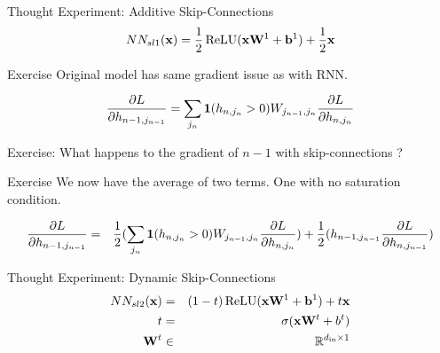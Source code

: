 \documentclass{beamer}
\begin{document}
\begin{frame}{Thought Experiment: Additive Skip-Connections}
  \[NN_{sl1}(\boldx) = \frac{1}{2} \relu(\boldx \boldW^1 + \boldb^1) + \frac{1}{2} \boldx \]
      \begin{center}
    \end{center}
  
\end{frame}

\begin{frame}{Exercise}
  Original model has same gradient issue as with RNN.

  \[ \frac{\partial L}{\partial h_{n-1,j_{n-1}} }   =  \sum_{j_n}  \mathbf{1}(h_{n, j_n} > 0) W_{j_{n-1},j_n}  \frac{\partial L}{\partial h_{n, j_n}}     \]


  Exercise: What happens to the gradient of $n-1$ with skip-connections ?
\end{frame}


\begin{frame}{Exercise}
  We now have the average of two terms. One with no saturation condition.
  \air 
  
  \begin{eqnarray*}
     \frac{\partial L}{\partial h_{n-1,j_{n-1}} } & = & \frac{1}{2} (\sum_{j_n}   \mathbf{1}(h_{n, j_n} > 0) W_{j_{n-1},j_n} \frac{\partial L}{\partial h_{n, j_n}}) + \frac{1}{2} ( h_{n-1, j_{n-1}} \frac{\partial L}{\partial h_{n, j_{n-1}}})  \\ 
  \end{eqnarray*}

 

\end{frame}

\begin{frame}{Thought Experiment: Dynamic Skip-Connections}
  \begin{eqnarray*}
    NN_{sl2}(\boldx) &=& (1-t) \relu(\boldx \boldW^1 + \boldb^1) + t \boldx \\
    t &=& \sigma(\boldx \boldW^t + b^t) \\
    \boldW^t &\in& \reals^{\din \times 1} 
  \end{eqnarray*}


      \begin{center}
    \end{center}
\end{frame}
\end{document}
